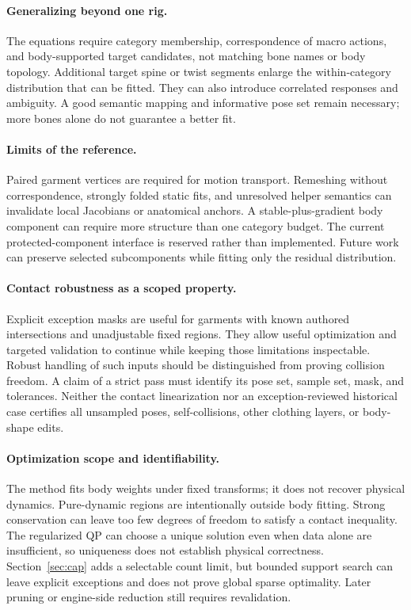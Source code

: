 \documentclass[10pt,twocolumn,letterpaper]{article}
\begin{document}
\paragraph{Generalizing beyond one rig.}
The equations require category membership, correspondence of macro actions, and body-supported target candidates, not matching bone names or body topology. Additional target spine or twist segments enlarge the within-category distribution that can be fitted. They can also introduce correlated responses and ambiguity. A good semantic mapping and informative pose set remain necessary; more bones alone do not guarantee a better fit.

\paragraph{Limits of the reference.}
Paired garment vertices are required for motion transport. Remeshing without correspondence, strongly folded static fits, and unresolved helper semantics can invalidate local Jacobians or anatomical anchors. A stable-plus-gradient body component can require more structure than one category budget. The current protected-component interface is reserved rather than implemented. Future work can preserve selected subcomponents while fitting only the residual distribution.

\paragraph{Contact robustness as a scoped property.}
Explicit exception masks are useful for garments with known authored intersections and unadjustable fixed regions. They allow useful optimization and targeted validation to continue while keeping those limitations inspectable. Robust handling of such inputs should be distinguished from proving collision freedom. A claim of a strict pass must identify its pose set, sample set, mask, and tolerances. Neither the contact linearization nor an exception-reviewed historical case certifies all unsampled poses, self-collisions, other clothing layers, or body-shape edits.

\paragraph{Optimization scope and identifiability.}
The method fits body weights under fixed transforms; it does not recover physical dynamics. Pure-dynamic regions are intentionally outside body fitting. Strong conservation can leave too few degrees of freedom to satisfy a contact inequality. The regularized QP can choose a unique solution even when data alone are insufficient, so uniqueness does not establish physical correctness. Section~\ref{sec:cap} adds a selectable count limit, but bounded support search can leave explicit exceptions and does not prove global sparse optimality. Later pruning or engine-side reduction still requires revalidation.
\end{document}
